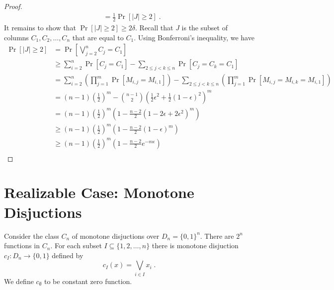 \documentclass[12pt]{article}
\begin{document}
\begin{proof}
\begin{align*}
& = \frac{1}{2} \Pr \left[ |J| \ge 2 \right] \; .
\end{align*}
It remains to show that $\Pr \left[ |J| \ge 2 \right] \ge 2 \delta$.
Recall that $J$ is the subset of columns $C_1, C_2, \dots, C_n$ that are equal to $C_1$.
Using Bonferroni's inequality, we have
\begin{align*}
\Pr\left[ |J| \ge 2 \right]
& = \Pr\left[ \bigvee_{j=2}^n C_j = C_1 \right] \\
& \ge \sum_{i=2}^n \Pr\left[ C_j = C_1 \right] - \sum_{2 \le  j < k \le n} \Pr\left[ C_j = C_k = C_1 \right] \\
& = \sum_{i=2}^n \left( \prod_{j=1}^m \Pr\left[ M_{i,j} = M_{i,1} \right] \right) - \sum_{2 \le j < k \le n} \left( \prod_{j=1}^m \Pr\left[ M_{i,j} = M_{i,k} = M_{i,1} \right] \right) \\
& = (n-1) \left( \frac{1}{2} \right)^m - \binom{n-1}{2} \left( \frac{1}{2} \epsilon^2 + \frac{1}{2} (1-\epsilon)^2 \right)^m \\
& = (n-1) \left( \frac{1}{2} \right)^m \left(1 - \frac{n-2}{2}(1 - 2\epsilon + 2\epsilon^2)^m \right) \\
& \ge (n-1) \left( \frac{1}{2} \right)^m \left(1 - \frac{n-2}{2}(1 - \epsilon)^m \right) \\
& \ge (n-1) \left( \frac{1}{2} \right)^m \left(1 - \frac{n-2}{2} e^{-m\epsilon} \right) \\
\end{align*}
\end{proof}

\section{Realizable Case: Monotone Disjuctions}

Consider the class $C_n$ of monotone disjuctions over $D_n = \{0,1\}^n$.
There are $2^n$ functions in $C_n$. For each subset $I \subseteq \{1,2,\dots,n\}$
there is monotone disjuction $c_I:D_n \to \{0,1\}$ defined by
$$
c_I(x) = \bigvee_{i \in I} x_i \; .
$$
We define $c_\emptyset$ to be constant zero function.
\end{document}
